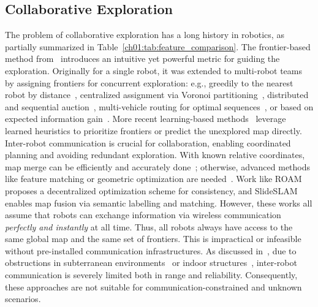 \subsection{Collaborative Exploration}
The problem of collaborative exploration has a long history in robotics,
as partially summarized in Table~\ref{ch01:tab:feature_comparison}.
The frontier-based method from~\cite{yamauchi1997frontier}
introduces an intuitive yet powerful metric for guiding the exploration.
Originally for a single robot, it was extended to multi-robot teams
by assigning frontiers for concurrent exploration:
e.g., greedily to the nearest robot by distance~\cite{yamauchi1999decentralized},
centralized assignment via Voronoi partitioning~\cite{bi2023cure},
distributed and sequential auction~\cite{hussein2014multi},
multi-vehicle routing for optimal sequences~\cite{zhou2023racer},
or based on expected information gain~\cite{burgard2005coordinated,
  baek2025pipe, patil2023graph}.
More recent learning-based methods~\cite{calzolari2024reinforcement, sygkounas2022multi}
leverage learned heuristics to prioritize frontiers or predict the unexplored map directly.
Inter-robot communication is crucial for collaboration, enabling coordinated
planning and avoiding redundant exploration.
With known relative coordinates, map merge can be
efficiently and accurately done~\cite{horner2016map}; otherwise, advanced
methods like feature matching or geometric optimization are needed~\cite{yu2020review}.
Work like ROAM~\cite{asgharivaskasi2025riemannian} proposes a decentralized optimization
scheme for consistency, and SlideSLAM~\cite{liu2024slideslam} enables map fusion via
semantic labelling and matching.
However, these works all assume that robots can exchange information via
wireless communication \emph{perfectly and instantly} at all time.
Thus, all robots always have access to {the same global map}
 and the same set of frontiers.
This is impractical or infeasible without pre-installed communication
infrastructures. As discussed in~\cite{esposito2006maintaining},
due to obstructions in subterranean environments~\cite{ohradzansky2022multi,
  dahlquist2025deployment}
or indoor structures~\cite{al2015enhanced},
inter-robot communication is severely limited both in range and reliability.
Consequently, these approaches are not suitable
for communication-constrained and unknown scenarios.


